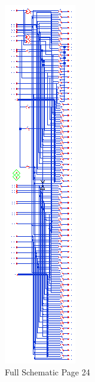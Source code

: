 \documentclass[11pt]{article}
\begin{document}
	
	\begin{figure}[H] 
		\centering 
		\includegraphics[width=0.7\linewidth]{"Pictures/Full Schematic Page 24"}
		\caption{Full Schematic Page 24} 
		\label{fig:Full-Schematic-Page-24} 
	\end{figure}
	
\end{document}
